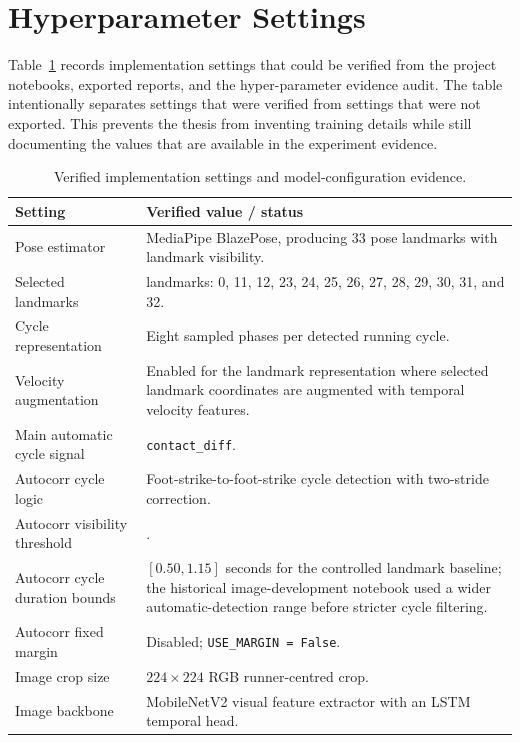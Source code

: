 \section{Hyperparameter Settings}
\label{app:hyperparams}

Table~\ref{tab:hyperparams} records implementation settings that could be
verified from the project notebooks, exported reports, and the hyper-parameter
evidence audit. The table intentionally separates settings that were verified
from settings that were not exported. This prevents the thesis from inventing
training details while still documenting the values that are available in the
experiment evidence.

\begin{table}[htbp]
\centering
\caption{Verified implementation settings and model-configuration evidence.}
\label{tab:hyperparams}
\renewcommand{\arraystretch}{1.15}
\scriptsize
\begin{tabularx}{\textwidth}{
>{\raggedright\arraybackslash}p{}
>{\raggedright\arraybackslash}X}
\toprule
Setting & Verified value / status \\
\midrule
Pose estimator & MediaPipe BlazePose, producing 33 pose landmarks with landmark visibility. \\
Selected landmarks & 13 landmarks: 0, 11, 12, 23, 24, 25, 26, 27, 28, 29, 30, 31, and 32. \\
Cycle representation & Eight sampled phases per detected running cycle. \\
Velocity augmentation & Enabled for the landmark representation where selected landmark coordinates are augmented with temporal velocity features. \\
Main automatic cycle signal & \texttt{contact\_diff}. \\
Autocorr cycle logic & Foot-strike-to-foot-strike cycle detection with two-stride correction. \\
Autocorr visibility threshold & 0.45. \\
Autocorr cycle duration bounds & $[0.50, 1.15]$ seconds for the controlled landmark baseline; the historical image-development notebook used a wider automatic-detection range before stricter cycle filtering. \\
Autocorr fixed margin & Disabled; \texttt{USE\_MARGIN = False}. \\
Image crop size & $224 \times 224$ RGB runner-centred crop. \\
Image backbone & MobileNetV2 visual feature extractor with an LSTM temporal head. \\

\end{tabularx}
\end{table}

